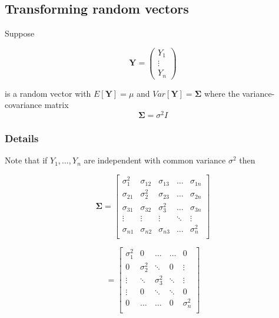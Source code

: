 \documentclass[12pt,a4paper]{article}
\theoremstyle{regla}
\theoremstyle{remark}
\theoremstyle{definition}
\theoremstyle{nonumberbreak}
\begin{document}
\subsection{Transforming random vectors}
\begin{fbox}
\begin{minipage}{0.97\textwidth}
Suppose 

\[\mathbf{Y}=
\left(
\begin{array}{c}
Y_1\\
\vdots \\
Y_n
\end{array} \right)\]

is a random vector with $E[\mathbf{Y}] = \mu$ and $Var[\mathbf{Y}] = \boldsymbol{\Sigma} $ where the variance-covariance matrix 
$$ \boldsymbol{\Sigma} = \sigma^2 I $$
\end{minipage}
\end{fbox}
\subsubsection{Details}
Note that if $Y_1, \ldots, Y_n$ are independent with common variance $\sigma^2$ then

\[
\boldsymbol{\Sigma}=
\left[
\begin{array}{ccccc}
\sigma_{1}^{2} & \sigma_{12} & \sigma_{13} & \ldots & \sigma_{1n} \\
\sigma_{21} & \sigma_2^{2} & \sigma_{23} & \ldots & \sigma_{2n} \\
\sigma_{31} &\sigma_{32}  &\sigma_3^{2}  & \ldots & \sigma_{3n}\\
\vdots & \vdots & \vdots & \ddots & \vdots \\
\sigma_{n1} & \sigma_{n2} & \sigma_{n3} & \ldots & \sigma_n^{2}\\ 
\end{array} \right]
\]




\[
 =
\left[
\begin{array}{ccccc}
\sigma_{1}^{2} & 0 & \ldots & \ldots & 0 \\
 0 & \sigma_2^{2} & \ddots & 0  & \vdots \\
 \vdots & \ddots  &\sigma_3^{2}  & \ddots & \vdots \\
\vdots & 0 & \ddots & \ddots & 0 \\
0 & \ldots & \ldots & 0 & \sigma_n^{2}\\ 
\end{array} \right]\]
\end{document}
